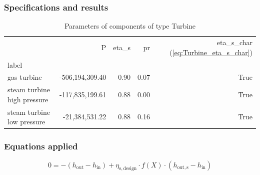 \documentclass[]{article}
\begin{document}
\subsubsection{Specifications and results}

\begin{table}[H]
\centering
\caption{Parameters of components of type Turbine}
\begin{tabular}{lrrrr}
\toprule
{} &                P & eta\_s &    pr &  eta\_s\_char (\ref{eq:Turbine_eta_s_char}) \\
label                       &                  &        &       &                                             \\
\midrule
gas turbine                 &  -506,194,309.40 &   0.90 &  0.07 &                                        True \\
steam turbine high pressure &  -117,835,199.61 &   0.88 &  0.00 &                                        True \\
steam turbine low pressure  &   -21,384,531.22 &   0.88 &  0.16 &                                        True \\
\bottomrule
\end{tabular}
\end{table}
\subsubsection{Equations applied}

\begin{equation}
\label{eq:Turbine_eta_s_char}
0=-\left(h_\mathrm{out}-h_\mathrm{in}\right)+\eta_\mathrm{s,design}\cdot f \left(X\right)\cdot\left(h_\mathrm{out,s}-h_\mathrm{in}\right)
\end{equation}
\end{document}
